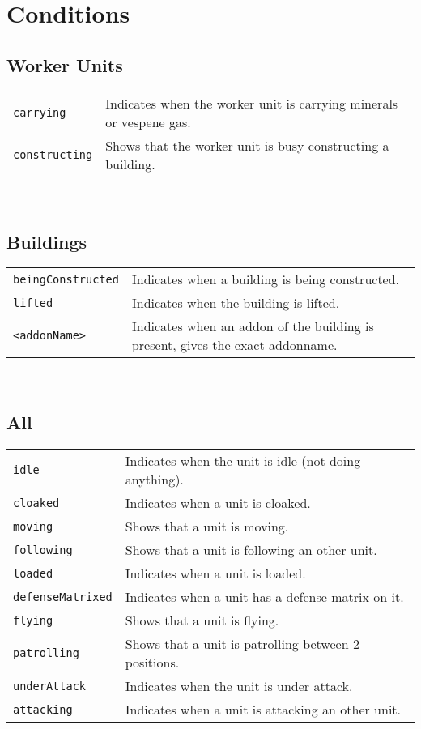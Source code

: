 \section{Conditions}
\label{conditions}

\subsection{Worker Units}
\begin{tabularx}{\textwidth}{lX}
 \verb|carrying| & Indicates when the worker unit is carrying minerals or vespene gas. \\
 \verb|constructing| & Shows that the worker unit is busy constructing a building.
\end{tabularx} \\

\subsection{Buildings}
\begin{tabularx}{\textwidth}{lX}
 \verb|beingConstructed| & Indicates when a building is being constructed. \\
 \verb|lifted| & Indicates when the building is lifted. \\
 \verb|<addonName>| & Indicates when an addon of the building is present, gives the exact addonname.
\end{tabularx} \\

\subsection{All}
\begin{tabularx}{\textwidth}{lX}
 \verb|idle| & Indicates when the unit is idle (not doing anything).\\
 \verb|cloaked| & Indicates when a unit is cloaked.\\
 \verb|moving| & Shows that a unit is moving.\\
 \verb|following| & Shows that a unit is following an other unit.\\
 \verb|loaded| & Indicates when a unit is loaded.\\
 \verb|defenseMatrixed| & Indicates when a unit has a defense matrix on it.\\
 \verb|flying| & Shows that a unit is flying.\\
 \verb|patrolling| & Shows that a unit is patrolling between 2 positions.\\
 \verb|underAttack| & Indicates when the unit is under attack.\\
 \verb|attacking | & Indicates when a unit is attacking an other unit.\\
\end{tabularx} \\

